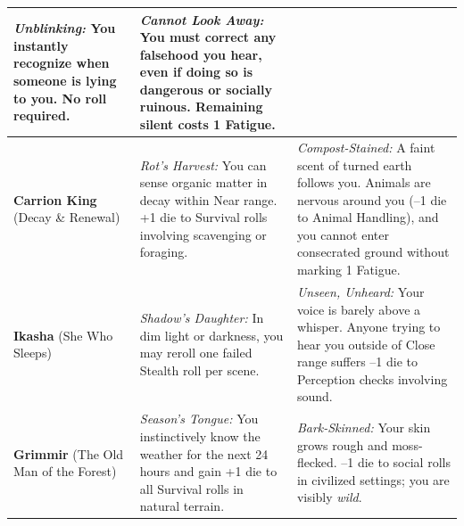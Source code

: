 \begin{longtable}{@{}p{3.2cm}p{4.8cm}p{4.8cm}@{}}
\begin{minipage}[t]{4.8cm}
\textit{Unblinking:} You instantly recognize when someone is lying to you. No roll required.
\end{minipage} &
\begin{minipage}[t]{4.8cm}
\vspace{0pt}
\textit{Cannot Look Away:} You must correct any falsehood you hear, even if doing so is dangerous or socially ruinous. Remaining silent costs 1 Fatigue.
\end{minipage} \\
\midrule
\textbf{Carrion King} (Decay \& Renewal) &
\begin{minipage}[t]{4.8cm}
\vspace{0pt}
\textit{Rot's Harvest:} You can sense organic matter in decay within Near range. +1 die to Survival rolls involving scavenging or foraging.
\end{minipage} &
\begin{minipage}[t]{4.8cm}
\vspace{0pt}
\textit{Compost-Stained:} A faint scent of turned earth follows you. Animals are nervous around you (--1 die to Animal Handling), and you cannot enter consecrated ground without marking 1 Fatigue.
\end{minipage} \\
\midrule
\textbf{Ikasha} (She Who Sleeps) &
\begin{minipage}[t]{4.8cm}
\vspace{0pt}
\textit{Shadow's Daughter:} In dim light or darkness, you may reroll one failed Stealth roll per scene.
\end{minipage} &
\begin{minipage}[t]{4.8cm}
\vspace{0pt}
\textit{Unseen, Unheard:} Your voice is barely above a whisper. Anyone trying to hear you outside of Close range suffers --1 die to Perception checks involving sound.
\end{minipage} \\
\midrule
\textbf{Grimmir} (The Old Man of the Forest) &
\begin{minipage}[t]{4.8cm}
\vspace{0pt}
\textit{Season's Tongue:} You instinctively know the weather for the next 24 hours and gain +1 die to all Survival rolls in natural terrain.
\end{minipage} &
\begin{minipage}[t]{4.8cm}
\vspace{0pt}
\textit{Bark-Skinned:} Your skin grows rough and moss-flecked. --1 die to social rolls in civilized settings; you are visibly \textit{wild}.

\end{minipage}
\end{longtable}
